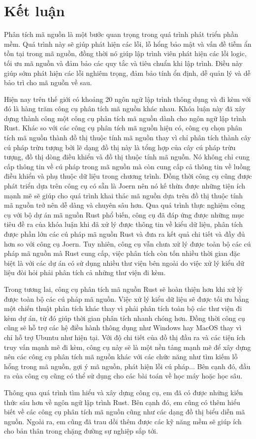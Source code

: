 \chapter*{Kết luận}

Phân tích mã nguồn là một bước quan trọng trong quá trình phát triển phần mềm. Quá trình này sẽ giúp phát hiện các lỗi, lỗ hổng bảo mật và vấn đề tiềm ẩn tồn tại trong mã nguồn, đồng thời nó giúp lập trình viên phát hiện các lỗi logic, tối ưu mã nguồn và đảm bảo các quy tắc và tiêu chuẩn khi lập trình. Điều này giúp sớm phát hiện các lỗi nghiêm trọng, đảm bảo tính ổn định, dễ quản lý và dễ bảo trì cho mã nguồn về sau.

Hiện nay trên thế giới có khoảng 20 ngôn ngữ lập trình thông dụng và đi kèm với đó là hàng trăm công cụ phân tích mã nguồn khác nhau. Khóa luận này đã xây dựng thành công một công cụ phân tích mã nguồn dành cho ngôn ngữ lập trình Rust. Khác so với các công cụ phân tích mã nguồn hiện có, công cụ chọn phân tích mã nguồn thành đồ thị thuộc tính mã nguồn thay vì chỉ phân tích thành cây cú pháp trừu tượng bởi lẽ dạng đồ thị này là tổng hợp của cây cú pháp trừu tượng, đồ thị dòng điều khiển và đồ thị thuộc tính mã nguồn. Nó không chỉ cung cấp thông tin về cú pháp trong mã nguồn mà còn cung cấp cả thông tin về luồng điều khiển và phụ thuộc dữ liệu trong chương trình. Đồng thời công cụ cũng được phát triển dựa trên công cụ có sẵn là Joern nên nó kế thừa được những tiện ích mạnh mẽ sẽ giúp cho quá trình khai thác mã nguồn dựa trên đồ thị thuộc tính mã nguồn trở nên dễ dàng và chuyên sâu hơn. Qua quá trình thực nghiệm công cụ với bộ dự án mã nguồn Rust phổ biến, công cụ đã đáp ứng được những mục tiêu đề ra của khóa luận khi đã xử lý được thông tin về kiểu dữ liệu, phân tích được phần lớn các cú pháp mã nguồn Rust và đưa ra kết quả chi tiết và đầy đủ hơn so với công cụ Joern. Tuy nhiên, công cụ vẫn chưa xử lý được toàn bộ các cú pháp mã nguồn mà Rust cung cấp, việc phân tích còn tốn nhiều thời gian đặc biệt là với các dự án có sử dụng nhiều thư viện bên ngoài do việc xử lý kiểu dữ liệu đòi hỏi phải phân tích cả những thư viện đi kèm.

Trong tương lai, công cụ phân tích mã nguồn Rust sẽ hoàn thiện hơn khi xử lý được toàn bộ các cú pháp mã nguồn. Việc xử lý kiểu dữ liệu sẽ được tối ưu bằng một chiến thuật phân tích khác thay vì phải phân tích toàn bộ các thư viện đi kèm dự án, từ đó giúp thời gian phân tích nhanh chóng hơn. Đồng thời công cụ cũng sẽ hỗ trợ các hệ điều hành thông dụng như Windows hay MacOS thay vì chỉ hỗ trợ Ubuntu như hiện tại. Với độ chi tiết của đồ thị đầu ra và các tiện ích truy vấn mạnh mẽ đi kèm, công cụ này sẽ là một nền tảng mạnh mẽ để xây dựng nên các công cụ phân tích mã nguồn khác với các chức năng như tìm kiếm lỗ hổng trong mã nguồn, gợi ý mã nguồn, phát hiện lỗi cú pháp... Bên cạnh đó, đầu ra của công cụ cũng có thể sử dụng cho các bài toán về học máy hoặc học sâu.

Thông qua quá trình tìm hiểu và xây dựng công cụ, em đã có được những kiến thức sâu hơn về ngôn ngữ lập trình Rust. Bên cạnh đó, em cũng có thêm hiểu biết về các công cụ phân tích mã nguồn cũng như các dạng đồ thị biểu diễn mã nguồn. Ngoài ra, em cũng đã trau dồi thêm được các kỹ năng mềm sẽ giúp ích cho bản thân trong chặng đường sự nghiệp sắp tới.